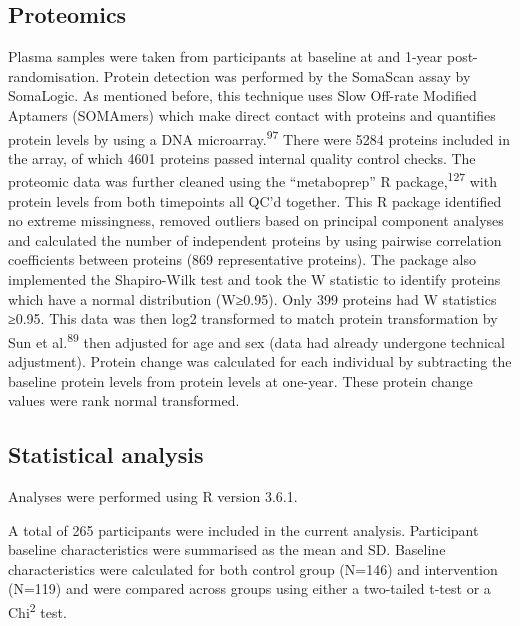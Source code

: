 \documentclass[11pt,twoside]{bristolthesis}
\begin{document}
\hypertarget{proteomics}{%
\subsection{Proteomics}\label{proteomics}}

Plasma samples were taken from participants at baseline at and 1-year post-randomisation. Protein detection was performed by the SomaScan assay by SomaLogic. As mentioned before, this technique uses Slow Off-rate Modified Aptamers (SOMAmers) which make direct contact with proteins and quantifies protein levels by using a DNA microarray.\textsuperscript{97} There were 5284 proteins included in the array, of which 4601 proteins passed internal quality control checks. The proteomic data was further cleaned using the ``metaboprep'' R package,\textsuperscript{127} with protein levels from both timepoints all QC'd together. This R package identified no extreme missingness, removed outliers based on principal component analyses and calculated the number of independent proteins by using pairwise correlation coefficients between proteins (869 representative proteins). The package also implemented the Shapiro-Wilk test and took the W statistic to identify proteins which have a normal distribution (W≥0.95). Only 399 proteins had W statistics ≥0.95. This data was then log2 transformed to match protein transformation by Sun et al.\textsuperscript{89} then adjusted for age and sex (data had already undergone technical adjustment). Protein change was calculated for each individual by subtracting the baseline protein levels from protein levels at one-year. These protein change values were rank normal transformed.

\hypertarget{statistical-analysis-3}{%
\subsection{Statistical analysis}\label{statistical-analysis-3}}

Analyses were performed using R version 3.6.1.

A total of 265 participants were included in the current analysis. Participant baseline characteristics were summarised as the mean and SD. Baseline characteristics were calculated for both control group (N=146) and intervention (N=119) and were compared across groups using either a two-tailed t-test or a Chi\textsuperscript{2} test.
\end{document}
